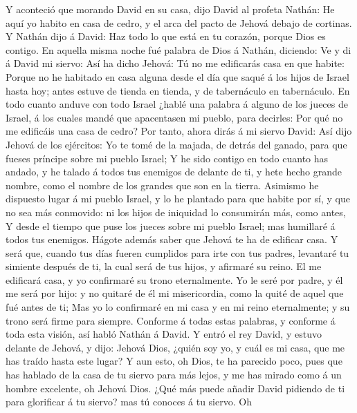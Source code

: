  Y aconteció que morando David en su casa, dijo David al
profeta Nathán: He aquí yo habito en casa de cedro, y el arca del pacto
de Jehová debajo de cortinas.  Y Nathán dijo á David: Haz
todo lo que está en tu corazón, porque Dios es contigo. 
En aquella misma noche fué palabra de Dios á Nathán, diciendo:
 Ve y di á David mi siervo: Así ha dicho Jehová: Tú no me
edificarás casa en que habite:  Porque no he habitado en
casa alguna desde el día que saqué á los hijos de Israel hasta hoy;
antes estuve de tienda en tienda, y de tabernáculo en tabernáculo.
 En todo cuanto anduve con todo Israel ¿hablé una palabra
á alguno de los jueces de Israel, á los cuales mandé que apacentasen mi
pueblo, para decirles: Por qué no me edificáis una casa de cedro?
 Por tanto, ahora dirás á mi siervo David: Así dijo Jehová
de los ejércitos: Yo te tomé de la majada, de detrás del ganado, para
que fueses príncipe sobre mi pueblo Israel;  Y he sido
contigo en todo cuanto has andado, y he talado á todos tus enemigos de
delante de ti, y hete hecho grande nombre, como el nombre de los grandes
que son en la tierra.  Asimismo he dispuesto lugar á mi
pueblo Israel, y lo he plantado para que habite por sí, y que no sea más
conmovido: ni los hijos de iniquidad lo consumirán más, como antes,
 Y desde el tiempo que puse los jueces sobre mi pueblo
Israel; mas humillaré á todos tus enemigos. Hágote además saber que
Jehová te ha de edificar casa.  Y será que, cuando tus
días fueren cumplidos para irte con tus padres, levantaré tu simiente
después de ti, la cual será de tus hijos, y afirmaré su reino.
 El me edificará casa, y yo confirmaré su trono
eternalmente.  Yo le seré por padre, y él me será por
hijo: y no quitaré de él mi misericordia, como la quité de aquel que fué
antes de ti;  Mas yo lo confirmaré en mi casa y en mi
reino eternalmente; y su trono será firme para siempre. 
Conforme á todas estas palabras, y conforme á toda esta visión, así
habló Nathán á David.  Y entró el rey David, y estuvo
delante de Jehová, y dijo: Jehová Dios, ¿quién soy yo, y cuál es mi
casa, que me has traído hasta este lugar?  Y aun esto, oh
Dios, te ha parecido poco, pues que has hablado de la casa de tu siervo
para más lejos, y me has mirado como á un hombre excelente, oh Jehová
Dios.  ¿Qué más puede añadir David pidiendo de ti para
glorificar á tu siervo? mas tú conoces á tu siervo.  Oh
